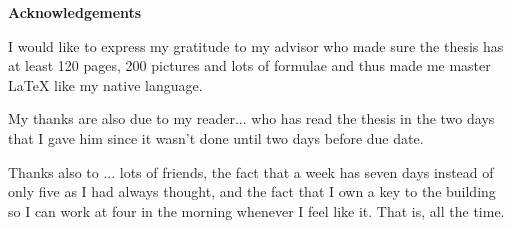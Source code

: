 \documentclass[12pt]{report}
\begin{document}


%
\begin{center}
	\textbf{Acknowledgements}
\end{center}

	I would like to express my gratitude to my advisor who made
	sure the thesis has at least 120 pages, 200 pictures and lots
	of formulae and thus made me master \LaTeX{} like my native
	language.

        My thanks are also due to my reader... who has read the thesis
        in the two days that I gave him since it wasn't done until two
        days before due date.

	Thanks also to ... lots of friends, the fact that a week has
	seven days instead of only five as I had always thought, and
	the fact that I own a key to the building so I can work at four
	in the morning whenever I feel like it. That is, all the time.


\clearpage



\tableofcontents


\listoffigures

\listoftables



\clearpage
\end{document}
